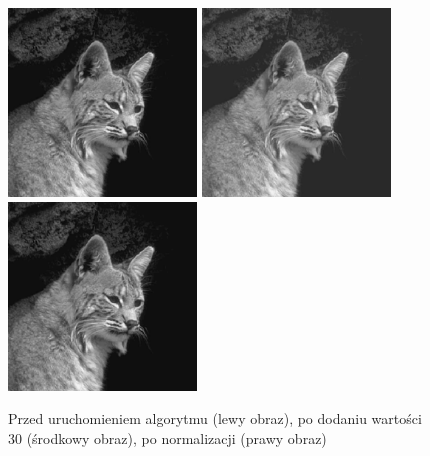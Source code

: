 \documentclass[a4paper,12pt]{book}
\begin{document}
\begin{figure}[H]
	\caption{Przed uruchomieniem algorytmu (lewy obraz), po dodaniu wartości 30 (środkowy obraz), po normalizacji (prawy obraz)}
	\includegraphics[width=5cm, height=5cm]{cat-unmodified.jpg}
	\includegraphics[width=5cm, height=5cm]{2/sum-gray-const-30.png}
	\includegraphics[width=5cm, height=5cm]{2/sum-gray-const-30-norm.png}
\end{figure}
\end{document}
